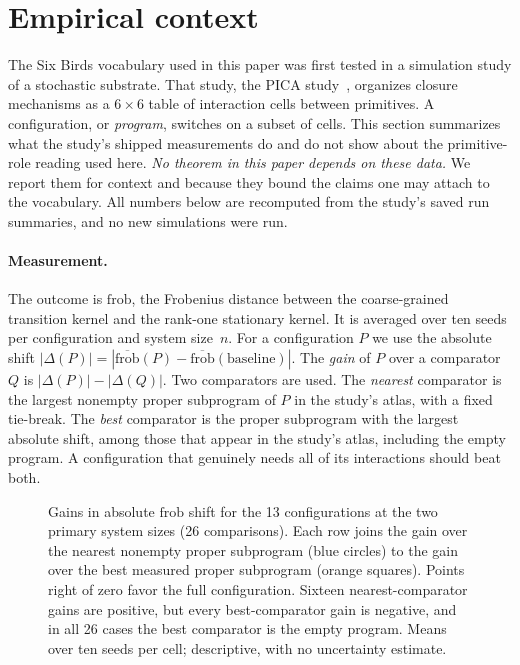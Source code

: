 \section{Empirical context}\label{sec:empirical}

The Six Birds vocabulary used in this paper was first tested in a simulation study of a stochastic substrate. That study, the PICA study~\cite{Tsiokos2026ToCreate}, organizes closure mechanisms as a $6\times 6$ table of interaction cells between primitives. A configuration, or \emph{program}, switches on a subset of cells. This section summarizes what the study's shipped measurements do and do not show about the primitive-role reading used here. \emph{No theorem in this paper depends on these data.} We report them for context and because they bound the claims one may attach to the vocabulary. All numbers below are recomputed from the study's saved run summaries, and no new simulations were run.

\paragraph{Measurement.}
The outcome is $\mathrm{frob}$, the Frobenius distance between the coarse-grained transition kernel and the rank-one stationary kernel. It is averaged over ten seeds per configuration and system size~$n$. For a configuration $P$ we use the absolute shift $|\Delta(P)|=|\overline{\mathrm{frob}}(P)-\overline{\mathrm{frob}}(\text{baseline})|$. The \emph{gain} of $P$ over a comparator $Q$ is $|\Delta(P)|-|\Delta(Q)|$. Two comparators are used. The \emph{nearest} comparator is the largest nonempty proper subprogram of $P$ in the study's atlas, with a fixed tie-break. The \emph{best} comparator is the proper subprogram with the largest absolute shift, among those that appear in the study's atlas, including the empty program. A configuration that genuinely needs all of its interactions should beat both.

\begin{figure}[t]
\centering

\caption{Gains in absolute $\mathrm{frob}$ shift for the 13 configurations at the two primary system sizes (26 comparisons). Each row joins the gain over the nearest nonempty proper subprogram (blue circles) to the gain over the best measured proper subprogram (orange squares). Points right of zero favor the full configuration. Sixteen nearest-comparator gains are positive, but every best-comparator gain is negative, and in all 26 cases the best comparator is the empty program. Means over ten seeds per cell; descriptive, with no uncertainty estimate.}
\label{fig:comparators}
\end{figure}

